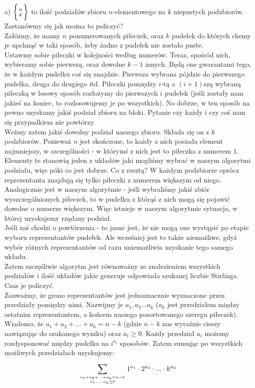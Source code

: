 \documentclass[a4paper,11pt]{article}
\begin{document}
{\Large a)  $ \bigg\{ {n \atop k} \bigg\} $ \small to ilość podziałów zbioru $n$-elementowego na $k$ niepustych podzbiorów. \\ 
Zastanówmy się jak można to policzyć? \\

Załóżmy, że mamy $n$ ponumerowanych piłeczek, oraz $k$ pudełek do których chemy je upchnąć w taki sposób, żeby żadno z pudełek nie zostało puste.\\

Ustawmy sobie piłeczki w kolejności według numerów. Teraz, spośród nich, wybieramy sobie pierwszą, oraz dowolne $k-1$ innych. Będą one gwarantami tego, że w każdym pudełku coś się znajdzie. Pierwsza wybrana pójdzie do pierwszego pudełka, druga do drugiego itd. Piłeczki pomiędzy $i$-tą a $(i+1)$szą wybraną piłeczką w losowy sposób rozłożymy do pierwszych $i$ pudełek (jeśli zostały nam jakieś na koniec, to rozlosowujemy je po wszystkich). No dobrze, w ten sposób na pewno uzyskamy jakiś podział zbioru na bloki. Pytanie czy każdy i czy coś nam się przypadkiem nie powtórzy.\\

Weźmy zatem jakiś dowolny podział naszego zbioru. Składa się on z $k$ podzbiorów. Ponieważ $n$ jest skończone, to każdy z nich posiada element najmniejszy, w szczególności - w którymś z nich jest to piłeczka z numerem $1$. Elementy te stanowią jeden z układów jaki mogliśmy wybrać w naszym algorytmi podziału, więc póki co jest dobrze. Co z resztą? W każdym podzbiorze oprócz reprezentanta znajdują się tylko piłeczki z numerem większym od niego. Analogicznie jest w naszym algorytmie - jeśli wybraliśmy jakiś zbiór wyszczególnionych piłeczek, to w pudełku z którąś z nich mogą się pojawić dowolne o numerze większym. Więc istnieje w naszym algorytmie sytuacja, w której uzyskujemy rządany podział. \\

Jeśli zaś chodzi o powtórzenia - to jasne jest, że nie mogą one wystąpić po etapie wyboru reprezentantów pudełek. Ale wcześniej jest to także niemożliwe, gdyż wybór różnych reprezentantów od razu uniemożliwia uzyskanie tego samego układu. \\

Zatem szczęśliwie algorytm jest równoważny ze znalezieniem wszystkich podziałów i ilość układów jakie generuje odpowiada szukanej liczbie Stirlinga. Czas je policzyć. \\

Zauważmy, że grono reprezentantów jest jednoznacznie wyznaczone przez przedziały pomiędzy nimi. Nazwijmy je $a_{1}, a_{2} ... a_{k}$ ($a_{k}$ jest przedziałem między ostatnim reprezentantem, a końcem naszego posortowanego szeregu piłeczek). Wiadomo, że $a_{1} + a_{2} + ... + a_{k} = n-k$ (gdzie $n-k$ nas wyraźnie cieszy nawiązując do szukanego wyniku) oraz $a_{i}\ge0$. Każdy przedział $a_{i}$ możemy rozdysponować między pudełka na $i^{a_{i}}$ sposobów. Zatem sumując po wszystkich możliwych przedziałach uzyskujemy: \\
\[
  \sum_{a_{1} + a_{2} + ... + a_{k} = n-k \atop a_{1}, ... ,a_{k}\ge0}^{} 1^{a_{1}} \cdot 2^{a_{2}} \cdot ... \cdot k^{a_{k}}
\]

}
\end{document}
